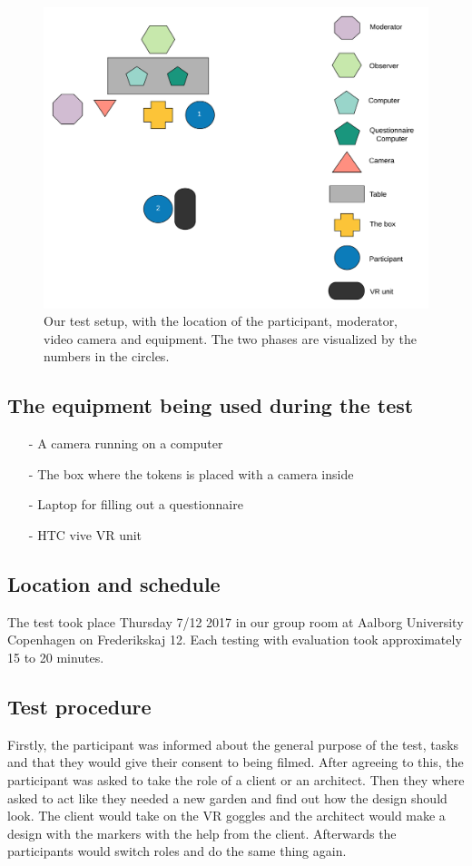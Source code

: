 \begin{figure}[H]
	\centering
	\includegraphics[width=1\linewidth]{figure/Evaluation/Test1.png}
	\caption{Our test setup, with the location of the participant, moderator, video camera and equipment. The two phases are visualized by the numbers in the circles.}
	\label{fig:test1}
\end{figure}

\subsection*{The equipment being used during the test}
\begin{itemize}
	\item[-] A camera running on a computer
	\item[-] The box where the tokens is placed with a camera inside
	\item[-] Laptop for filling out a questionnaire
	\item[-] HTC vive VR unit
\end{itemize}

\subsection*{Location and schedule}
The test took place Thursday 7/12 2017 in our group room at Aalborg University Copenhagen on Frederikskaj 12. Each testing with evaluation took approximately 15 to 20 minutes.

\subsection*{Test procedure}
Firstly, the participant was informed about the general purpose of the test, tasks and that they would give their consent to being filmed. After agreeing to this, the participant was asked to take the role of a client or an architect. Then they where asked to act like they needed a new garden and find out how the design should look. The client would take on the VR goggles and the architect would make a design with the markers with the help from the client. Afterwards the participants would switch roles and do the same thing again.

